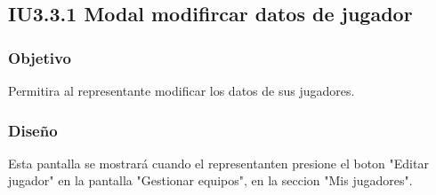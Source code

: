 
\subsection{IU3.3.1 Modal modifircar datos de jugador}

\subsubsection{Objetivo}
	Permitira al representante modificar los datos de sus jugadores.

\subsubsection{Diseño}
	Esta pantalla se mostrará cuando el representanten presione el boton "Editar jugador" en la pantalla "Gestionar equipos", en la seccion "Mis jugadores".

